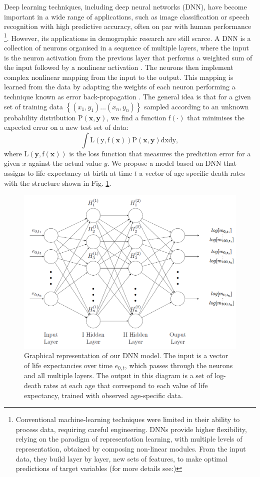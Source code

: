 \documentclass[a4,11pt]{article}
\begin{document}
Deep learning techniques, including deep neural networks (DNN), have become important in a wide range of applications, such as image classification or speech recognition with high predictive accuracy, often on par with human performance \footnote{Conventional machine-learning techniques were limited in their ability to process data, requiring careful engineering. DNNs provide higher flexibility, relying on the paradigm of representation learning, with multiple levels of representation, obtained by composing non-linear modules. From the input data, they build layer by layer, new sets of features, to make optimal predictions of target variables (for more details see:\citep{lecun2015})}. 
However, its applications in demographic research are still scarce. A DNN is a collection of neurons organised in a sequence of multiple layers, where the input is the neuron activation from the previous layer that performs a weighted sum of the input followed by a nonlinear activation \citep{MONTAVON20181}. The neurons then implement complex nonlinear mapping from the input to the output. This mapping is learned from the data by adapting the weights of each neuron performing a technique known as error back-propagation \citep{Rumelhart}. The general idea is that for a given set of training data $\left\{\left(x_{1},y_{1}\right) \ldots\left(x_{n},y_{n}\right)\right\}$ sampled according to an unknown probability distribution $\mathrm{P}(\mathbf{x}, 
 \mathbf{y})$, we find a function $\mathrm{f(\cdot)}$ that minimises the expected error on a new test set of data:
 $$
\int \mathrm{L}(\mathrm{y}, \mathrm{f}(\mathbf{x})) \mathrm{P}(\mathbf{x}, \mathbf{y}) \mathrm{d} \mathrm{x} \mathrm{dy},
$$
where $\mathrm{L}(\mathbf{y}, \mathrm{f}(\mathbf{x}))$ is the loss function that measures the prediction error for a given $x$ against the actual value $y$. We propose a model based on DNN that assigns to life expectancy at birth at time $t$ a vector of age specific death rates with the structure shown in Fig. \ref{fig:NN}.

\begin{figure}[H]
\centering
\includegraphics[width=0.8\linewidth]{NNmodel.png}
\caption{Graphical representation of our DNN model. The input is a vector of life expectancies over time $e_{0,t}$, which passes through the neurons and all multiple layers. The output in this diagram is a set of log-death rates at each age that correspond to each value of life expectancy, trained with observed age-specific data.}
\label{fig:NN}
\end{figure}
\end{document}
